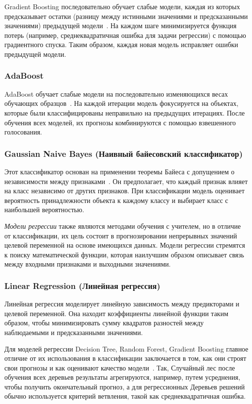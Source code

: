 Gradient Boosting последовательно обучает слабые модели, каждая из которых предсказывает остатки (разницу между истинными значениями и предсказанными значениями) предыдущей модели~\cite{hastie2001elements}. На каждом шаге минимизируется функция потерь (например, среднеквадратичная ошибка для задачи регрессии) с помощью градиентного спуска. Таким образом, каждая новая модель исправляет ошибки предыдущей модели.
\vspace{1em}

\subsubsection*{AdaBoost}
    
AdaBoost обучает слабые модели на последовательно изменяющихся весах обучающих образцов~\cite{Hastie2009MulticlassA}. На каждой итерации модель фокусируется на объектах, которые были классифицированы неправильно на предыдущих итерациях. После обучения всех моделей, их прогнозы комбинируются с помощью взвешенного голосования.
\vspace{1em}

\subsubsection*{Gaussian Naive Bayes (Наивный байесовский классификатор)}

Этот классификатор основан на применении теоремы Байеса с допущением о независимости между признаками~\cite{Zhang2004}. Он предполагает, что каждый признак влияет на класс независимо от других признаков. При классификации модель оценивает вероятность принадлежности объекта к каждому классу и выбирает класс с наибольшей вероятностью.
\vspace{1.5em}

\textit{Модели регрессии} также являются методами обучения с учителем, но в отличие от классификации, их цель состоит в прогнозировании непрерывных значений целевой переменной на основе имеющихся данных. Модели регрессии стремятся к поиску математической функции, которая наилучшим образом описывает связь между входными признаками и выходными значениями.
\vspace{1em}

\subsubsection*{Linear Regression (Линейная регрессия) }

Линейная регрессия моделирует линейную зависимость между предикторами и целевой переменной. Она находит коэффициенты линейной функции таким образом, чтобы минимизировать сумму квадратов разностей между наблюдаемыми и предсказанными значениями.

Для моделей регрессии Decision Tree, Random Forest, Gradient Boosting главное отличие от их использования в классификации заключается в том, как они строят свои прогнозы и как оценивают качество модели~\cite{Nunez2011}. Так, Случайный лес после обучения всех деревьев результаты агрегируются, например, путем усреднения, чтобы получить окончательный прогноз, а для регрессионных Деревьев решений обычно используется критерий ветвления, такой как среднеквадратичная ошибка.
